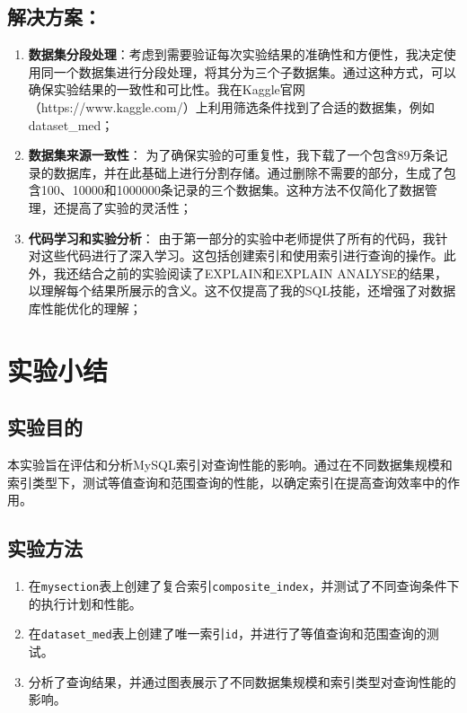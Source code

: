 \documentclass{article}
\begin{document}
	\subsection{解决方案：}
	
	\begin{enumerate}[noitemsep, label={{\arabic*})}]
		\item \textbf{数据集分段处理}：考虑到需要验证每次实验结果的准确性和方便性，我决定使用同一个数据集进行分段处理，将其分为三个子数据集。通过这种方式，可以确保实验结果的一致性和可比性。我在Kaggle官网（https://www.kaggle.com/）上利用筛选条件找到了合适的数据集，例如dataset\_med；
		\item \textbf{数据集来源一致性}： 为了确保实验的可重复性，我下载了一个包含89万条记录的数据库，并在此基础上进行分割存储。通过删除不需要的部分，生成了包含100、10000和1000000条记录的三个数据集。这种方法不仅简化了数据管理，还提高了实验的灵活性；
		\item \textbf{代码学习和实验分析}： 由于第一部分的实验中老师提供了所有的代码，我针对这些代码进行了深入学习。这包括创建索引和使用索引进行查询的操作。此外，我还结合之前的实验阅读了EXPLAIN和EXPLAIN ANALYSE的结果，以理解每个结果所展示的含义。这不仅提高了我的SQL技能，还增强了对数据库性能优化的理解；
	\end{enumerate}\textbf{}
	
	\section{实验小结}
	
	\subsection{实验目的}
	本实验旨在评估和分析MySQL索引对查询性能的影响。通过在不同数据集规模和索引类型下，测试等值查询和范围查询的性能，以确定索引在提高查询效率中的作用。
	
	\subsection{实验方法}
	\begin{enumerate}
		\item 在\texttt{mysection}表上创建了复合索引\texttt{composite\_index}，并测试了不同查询条件下的执行计划和性能。
		\item 在\texttt{dataset\_med}表上创建了唯一索引\texttt{id}，并进行了等值查询和范围查询的测试。
		\item 分析了查询结果，并通过图表展示了不同数据集规模和索引类型对查询性能的影响。
	\end{enumerate}
	
\end{document}
